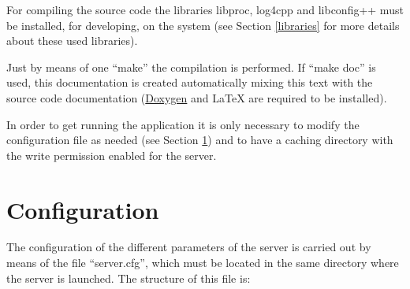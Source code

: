 For compiling the source code the libraries libproc, log4cpp and libconfig++
must be installed, for developing, on the system (see Section \ref{libraries} 
for more details about these used libraries). 

Just by means of one ``make'' the compilation is performed. If ``make doc'' is
used, this documentation is created automatically mixing this text with the
source code documentation (\href{http://www.stack.nl/~dimitri/doxygen/}{Doxygen} 
and LaTeX are required to be installed).

In order to get running the application it is only necessary to modify the
configuration file as needed (see Section \ref{config}) and to have a caching
directory with the write permission enabled for the server.

\section{Configuration}
\label{config}

The configuration of the different parameters of the server is carried out by
means of the file ``server.cfg'', which must be located in the same directory
where the server is launched. The structure of this file is:

